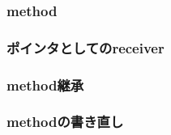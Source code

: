 
\subsubsection{method}

\subsubsection{ポインタとしてのreceiver}

\subsubsection{method継承}

\subsubsection{methodの書き直し}

